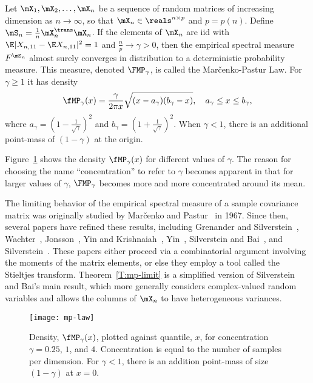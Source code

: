 \begin{theorem}\label{T:mp-limit}
Let $\mX_1, \mX_2, \ldots, \mX_n$ be a sequence of random matrices of increasing dimension as $n \to \infty$, so that $\mX_n \in \reals^{n\times p}$ and $p = p(n)$.
Define $\mS_n = \frac{1}{n} \mX_n^\trans \mX_n$.  If the elements of $\mX_n$ are iid with $\E| X_{n,11} - \E X_{n,11} |^2 = 1$ and $\frac{n}{p} \to \gamma > 0$, then the empirical spectral measure $F^{\mS_n}$ almost surely converges in distribution to a deterministic probability measure.  This measure, denoted
$\FMP_\gamma$, is called the Mar\v{c}enko-Pastur Law.  For $\gamma \geq 1$ it
has density
\begin{equation}
    \fMP_\gamma(x)
    =
    \frac{\gamma}{2 \pi x}
    \sqrt{(x - a_\gamma)(b_\gamma - x)},
    \quad
    a_\gamma \leq x \leq b_\gamma,
\end{equation}
where
\(
    a_\gamma = \left( 1 - \frac{1}{\sqrt{\gamma}} \right)^2
\)
and
\(
    b_\gamma = \left( 1 + \frac{1}{\sqrt{\gamma}} \right)^2.
\)
When $\gamma < 1$, there is an additional point-mass of $(1 - \gamma)$ at the origin.
\end{theorem}

\noindent
Figure~\ref{F:mp-law} shows the density $\fMP_\gamma(x)$ for different values
of $\gamma$.  The reason for choosing the name ``concentration'' to refer to $\gamma$ becomes apparent in that for larger values of $\gamma$, $\FMP_\gamma$ becomes more and more concentrated around its mean.

The limiting behavior of the empirical spectral measure of a sample covariance matrix was originally studied by Mar\v{c}enko and Pastur~\cite{marcenko1967des} in 1967.  Since then, several papers have refined these results, including Grenander and Silverstein~\cite{grenander1977san}, Wachter~\cite{wachter1978slr},
 Jonsson~\cite{jonsson1982slt}, Yin and Krishnaiah~\cite{yin1983lte},
Yin~\cite{yin1986lsd}, Silverstein and Bai~\cite{silverstein1995ede}, and
Silverstein~\cite{silverstein1995sce}.  These papers either proceed via a combinatorial argument involving the moments of the matrix elements, or else they employ a tool called the Stieltjes transform.  Theorem~\ref{T:mp-limit} is a simplified version of Silverstein and Bai's main result, which more generally considers complex-valued random variables and allows the columns of $\mX_n$ to have heterogeneous variances.

\begin{figure}
    \centering
    \texttt{[image: mp-law]}
    \caption{
        Density, $\fMP_\gamma(x)$, plotted against quantile, $x$,
        for concentration $\gamma = 0.25$, $1$, and $4$.  Concentration
        is equal to the number of samples per dimension. For $\gamma < 1$,
        there is an addition point-mass of size $(1 - \gamma)$ at $x = 0$.
    }\label{F:mp-law}
\end{figure}

